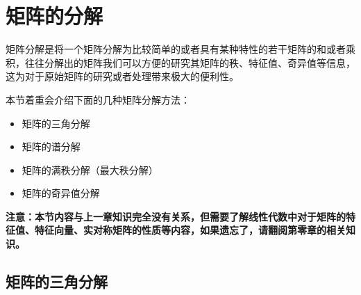 \documentclass[12pt, a4paper, oneside, UTF8]{ctexbook}
\begin{document}
\else
\fi
\chapter{矩阵的分解}
矩阵分解是将一个矩阵分解为比较简单的或者具有某种特性的若干矩阵的和或者乘积，往往分解出的矩阵我们可以方便的研究其矩阵的秩、特征值、奇异值等信息，这为对于原始矩阵的研究或者处理带来极大的便利性。

本节着重会介绍下面的几种矩阵分解方法：

\begin{itemize}[leftmargin=4em]
    \item 矩阵的三角分解
    \item 矩阵的谱分解
    \item 矩阵的满秩分解（最大秩分解）
    \item 矩阵的奇异值分解
\end{itemize}

\textbf{注意：本节内容与上一章知识完全没有关系，但需要了解线性代数中对于矩阵的特征值、特征向量、实对称矩阵的性质等内容，如果遗忘了，请翻阅第零章的相关知识。}

\section{矩阵的三角分解}
\end{document}
